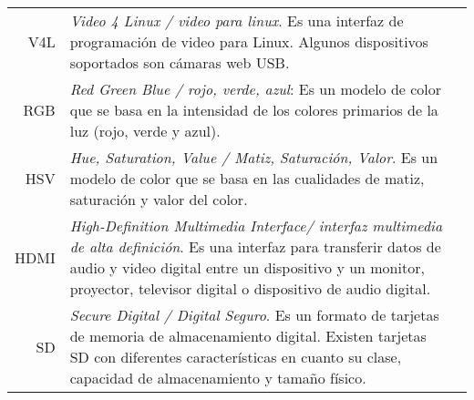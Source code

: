 \begin{tabular}{r p{13cm}l }
   V4L & \emph{Video 4 Linux / video para linux}. Es una interfaz de programación de video para Linux. Algunos dispositivos soportados son cámaras web USB. \\
   
   RGB & \emph{Red Green Blue / rojo, verde, azul}: Es un modelo de color que se basa en la intensidad de los colores primarios de la luz (rojo, verde y azul).\\
   
   HSV & \emph{Hue, Saturation, Value / Matiz, Saturación, Valor}. Es un modelo de color que se basa en las cualidades de matiz, saturación y valor del color. \\
   
	HDMI & \emph{High-Definition Multimedia Interface/ interfaz multimedia de alta definición}. Es una interfaz para transferir datos de audio y video digital entre un dispositivo y un monitor, proyector, televisor digital o dispositivo de audio digital. \\
	
	SD & \emph{Secure Digital / Digital Seguro}. Es un formato de tarjetas de memoria de almacenamiento digital. Existen tarjetas SD con diferentes características en cuanto su clase, capacidad de almacenamiento y tamaño físico.
	
\end{tabular}

 
 


  
 

  

 
